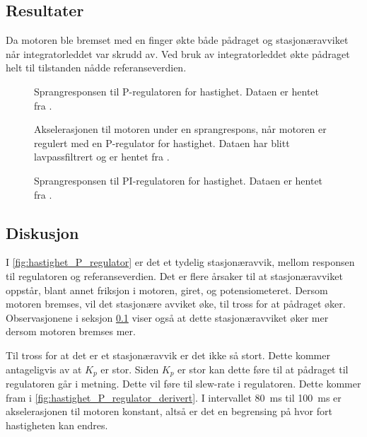 \subsection{Resultater}

\label{obs:hastighet_regulator_breming_med_finger}
Da motoren ble bremset med en finger økte både pådraget og stasjonæravviket når integratorleddet var skrudd av. Ved bruk av integratorleddet økte pådraget helt til tilstanden nådde referanseverdien.

\begin{figure}[h]
    \centering
    
    \caption{Sprangresponsen til P-regulatoren for hastighet. Dataen er hentet fra \cite{EksempelData}.}
    \label{fig:hastighet_P_regulator}
\end{figure}

\begin{figure}[h!]
    \centering
    
    \caption{
        Akselerasjonen til motoren under en sprangrespons, når motoren er regulert med en P-regulator for hastighet.
        Dataen har blitt lavpassfiltrert og er hentet fra \cite{EksempelData}.
    }
    \label{fig:hastighet_P_regulator_derivert}
\end{figure}

\begin{figure}[h!]
    \centering
    
    \caption{Sprangresponsen til PI-regulatoren for hastighet. Dataen er hentet fra \cite{EksempelData}.}
    \label{fig:hastighet_PI_regulator}
\end{figure}






\subsection{Diskusjon}

I \autoref{fig:hastighet_P_regulator} er det et tydelig stasjonæravvik, mellom responsen til regulatoren og referanseverdien. Det er flere årsaker til at stasjonæravviket oppstår, blant annet friksjon i motoren, giret, og potensiometeret.
Dersom motoren bremses, vil det stasjonære avviket øke, til tross for at pådraget øker. Observasjonene i seksjon \ref{obs:hastighet_regulator_breming_med_finger} viser også at dette stasjonæravviket øker mer dersom motoren bremses mer.

Til tross for at det er et stasjonæravvik er det ikke så stort. Dette kommer antageligvis av at $K_p$ er stor. Siden $K_p$ er stor kan dette føre til at pådraget til regulatoren går i metning. Dette vil føre til slew-rate i regulatoren. Dette kommer fram i \autoref{fig:hastighet_P_regulator_derivert}. I intervallet \SI{80}{\milli\second} til \SI{100}{\milli\second} er akselerasjonen til motoren konstant, altså er det en begrensing på hvor fort hastigheten kan endres.

